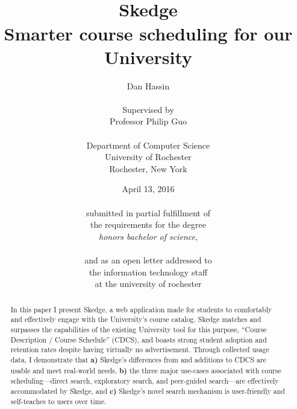 \documentclass[titlepage]{report}
\title{
\vspace{60pt}\\
\huge \bfseries Skedge \\
\vspace{10pt}
\Large
Smarter course scheduling for our University
}
\author{
	Dan Hassin\\
    \vspace{5pt}\\
    Supervised by\\
    Professor Philip Guo\\
    \vspace{2pt}\\
    Department of Computer Science\\
    University of Rochester\\
    Rochester, New York\\
}
\date{April 13, 2016\\
    \vspace{80pt}\\
    submitted in partial fulfillment of\\
    the requirements for the degree\\
    \emph{honors bachelor of science},\\
    \vspace{40pt}\\
    and as an open letter addressed to\\
    the information technology staff\\
    at the university of rochester
    \vspace{-80pt}
}
\begin{document}
\maketitle


\onehalfspacing

\setcounter{tocdepth}{1}
\tableofcontents

\listoffigures

\clearpage


\doublespacing


\begin{abstract}

\thispagestyle{plain}

In this paper I present Skedge, a web application made for students to comfortably and effectively engage with the University’s course catalog. Skedge matches and surpasses the capabilities of the existing University tool for this purpose, ``Course Description / Course Schedule'' (CDCS), and boasts strong student adoption and retention rates despite having virtually no advertisement. Through collected usage data, I demonstrate that \textbf{a)} Skedge's differences from and additions to CDCS are usable and meet real-world needs, \textbf{b)} the three major use-cases associated with course scheduling---direct search, exploratory search, and peer-guided search---are effectively accommodated by Skedge, and \textbf{c)} Skedge's novel search mechanism is user-friendly and self-teaches to users over time.

\end{abstract}




\setlength{\skip\footins}{0.75cm}



\clearpage


\clearpage


\clearpage


\clearpage


\clearpage


\singlespacing


\begin{spacing}{1.1}




\end{spacing}


\end{document}
